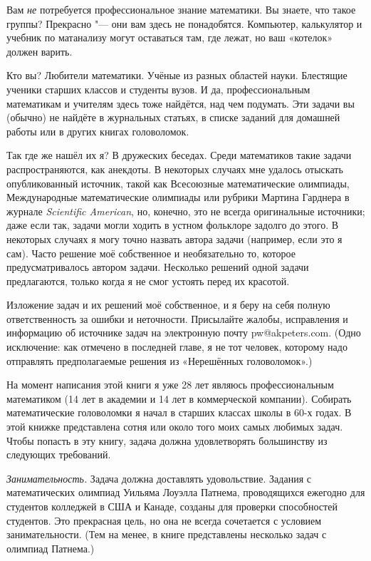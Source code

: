 \documentclass[twoside]{book}
\begin{document}
Вам \emph{не} потребуется профессиональное знание математики.
Вы знаете, что такое группы? Прекрасно "---  они вам здесь не понадобятся.
Компьютер, калькулятор и учебник по матанализу %
могут оставаться там, где лежат, но ваш «котелок» должен варить.

Кто вы? Любители математики.
Учёные из разных областей науки.
Блестящие ученики старших классов и студенты вузов.
И да, профессиональным математикам и учителям здесь тоже найдётся, над чем подумать.
Эти задачи вы (обычно) не найдёте в журнальных статьях, в списке заданий для домашней работы или в других книгах головоломок.

Так где же нашёл их я?
В дружеских беседах.
Среди математиков такие задачи распространяются, как анекдоты.
В некоторых случаях мне удалось отыскать опубликованный источник, такой как Всесоюзные математические олимпиады, Международные математические олимпиады или рубрики Мартина Гарднера в журнале \emph{Scientific American}, но, конечно, это не всегда оригинальные источники;
даже если так, задачи могли ходить в устном фольклоре задолго до этого.
В некоторых случаях я могу точно назвать автора задачи (например, если это я сам).
Часто решение моё собственное и необязательно то, которое предусматривалось автором задачи.
Несколько решений одной задачи предлагаются, только когда я не смог устоять перед их красотой.

Изложение задач и их решений моё собственное, и я беру на себя полную ответственность за ошибки и неточности.
Присылайте жалобы, исправления и информацию об источнике задач на электронную почту pw@akpeters.com.
(Одно исключение: как отмечено в последней главе, я не тот человек, которому надо отправлять предполагаемые решения из «Нерешённых головоломок».)

На момент написания этой книги я уже 28 лет являюсь профессиональным математиком
(14 лет в академии и 14 лет в коммерческой компании).
Собирать математические головоломки я начал в старших классах школы в 60-х годах.
В этой книжке представлена сотня или около того моих самых любимых задач.
Чтобы попасть в эту книгу, задача должна удовлетворять большинству из следующих требований.

\textit{Занимательность.}
Задача должна доставлять удовольствие.
Задания с математических олимпиад Уильяма Лоуэлла Патнема, проводящихся ежегодно для студентов колледжей в США и Канаде, созданы для проверки способностей студентов.
Это прекрасная цель, но она не всегда сочетается с условием занимательности.
(Тем на менее, в книге представлены несколько задач с олимпиад Патнема.)
\end{document}
